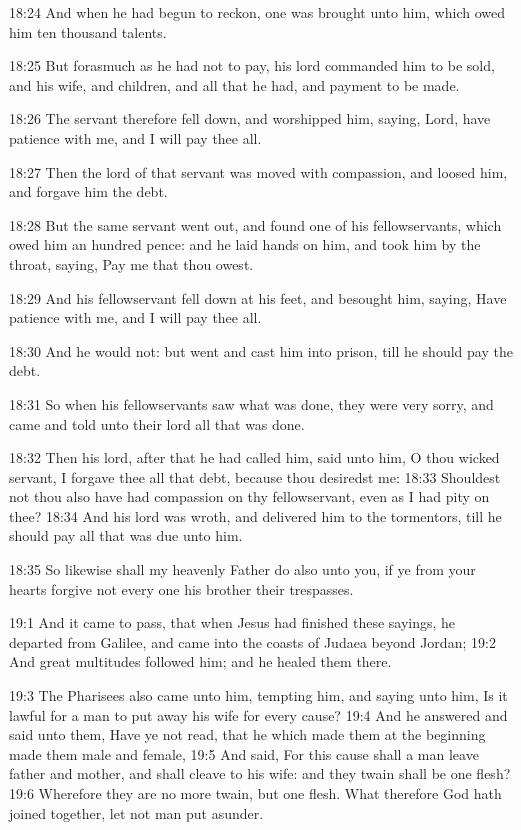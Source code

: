 18:24 And when he had begun to reckon, one was brought unto him, which owed him ten thousand talents.

18:25 But forasmuch as he had not to pay, his lord commanded him to be sold, and his wife, and children, and all that he had, and payment to be made.

18:26 The servant therefore fell down, and worshipped him, saying, Lord, have patience with me, and I will pay thee all.

18:27 Then the lord of that servant was moved with compassion, and loosed him, and forgave him the debt.

18:28 But the same servant went out, and found one of his fellowservants, which owed him an hundred pence: and he laid hands on him, and took him by the throat, saying, Pay me that thou owest.

18:29 And his fellowservant fell down at his feet, and besought him, saying, Have patience with me, and I will pay thee all.

18:30 And he would not: but went and cast him into prison, till he should pay the debt.

18:31 So when his fellowservants saw what was done, they were very sorry, and came and told unto their lord all that was done.

18:32 Then his lord, after that he had called him, said unto him, O thou wicked servant, I forgave thee all that debt, because thou desiredst me: 18:33 Shouldest not thou also have had compassion on thy fellowservant, even as I had pity on thee?  18:34 And his lord was wroth, and delivered him to the tormentors, till he should pay all that was due unto him.

18:35 So likewise shall my heavenly Father do also unto you, if ye from your hearts forgive not every one his brother their trespasses.

19:1 And it came to pass, that when Jesus had finished these sayings, he departed from Galilee, and came into the coasts of Judaea beyond Jordan; 19:2 And great multitudes followed him; and he healed them there.

19:3 The Pharisees also came unto him, tempting him, and saying unto him, Is it lawful for a man to put away his wife for every cause?  19:4 And he answered and said unto them, Have ye not read, that he which made them at the beginning made them male and female, 19:5 And said, For this cause shall a man leave father and mother, and shall cleave to his wife: and they twain shall be one flesh?  19:6 Wherefore they are no more twain, but one flesh. What therefore God hath joined together, let not man put asunder.

